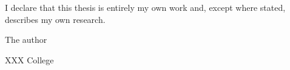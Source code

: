\begin{declaration}

I declare that this thesis is entirely my own work and, except where stated, describes my own research.

\bigbreak
\bigbreak

\noindent The author

\noindent XXX College

\end{declaration}
